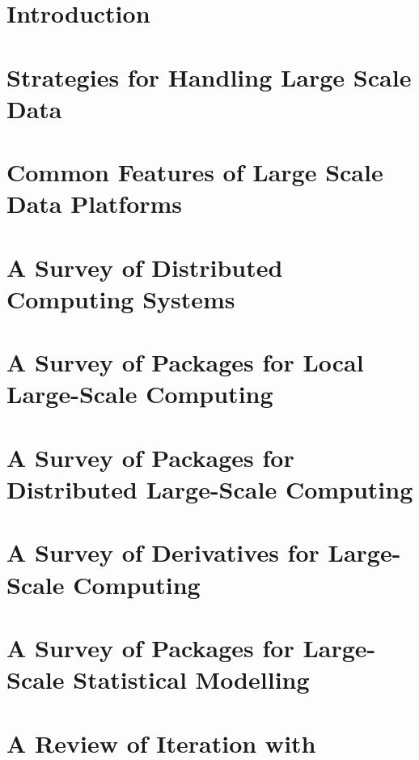 \section{Introduction}\label{sec:lit-review-intro}

\section{Strategies for Handling Large Scale Data}\label{sec:lit-review-strategies}

\section{Common Features of Large Scale Data Platforms}\label{sec:large-scale-features}

\section{A Survey of Distributed Computing Systems}\label{sec:survey-dist-comp-sys}

\section{A Survey of \R Packages for Local Large-Scale Computing}\label{sec:survey-r-local-packages}

\section{A Survey of \R Packages for Distributed Large-Scale Computing}\label{sec:survey-r-dist-packages}

\section{A Survey of \R Derivatives for Large-Scale Computing}\label{sec:survey-r-deriv}

\section{A Survey of \R Packages for Large-Scale Statistical Modelling}\label{sec:survey-r-stat-model-packages}

\section{A Review of Iteration with }\label{sec:review-iteration-sparklyr}

